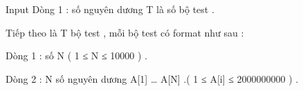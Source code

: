 Input
Dòng 1 : số nguyên dương T là số bộ test .   


   Tiếp theo là T bộ test , mỗi bộ test có format như sau :   


   Dòng 1 : số N ( 1 ≤ N ≤ 10000 ) .   


   Dòng 2 : N số nguyên dương A[1] … A[N] .( 1 ≤ A[i] ≤ 2000000000 ) .